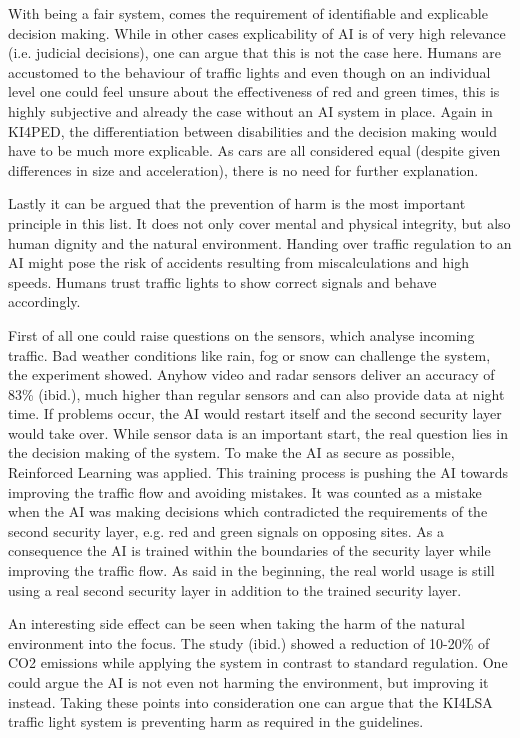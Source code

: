 With being a fair system, comes the requirement of identifiable and explicable decision making. While in other cases explicability of AI is of very high relevance (i.e. judicial decisions), one can argue that this is not the case here. Humans are accustomed to the behaviour of traffic lights and even though on an individual level one could feel unsure about the effectiveness of red and green times, this is highly subjective and already the case without an AI system in place. Again in KI4PED, the differentiation between disabilities and the decision making would have to be much more explicable. As cars are all considered equal (despite given differences in size and acceleration), there is no need for further explanation.

Lastly it can be argued that the prevention of harm is the most important principle in this list. It does not only cover mental and physical integrity, but also human dignity and the natural environment. Handing over traffic regulation to an AI might pose the risk of accidents resulting from miscalculations and high speeds. Humans trust traffic lights to show correct signals and behave accordingly.

First of all one could raise questions on the sensors, which analyse incoming traffic. Bad weather conditions like rain, fog or snow can challenge the system, the experiment showed. Anyhow video and radar sensors deliver an accuracy of 83\% 
(ibid.), much higher than regular sensors and can also provide data at night time. If problems occur, the AI would restart itself and the second security layer would take over. While sensor data is an important start, the real question lies in the decision making of the system. To make the AI as secure as possible, Reinforced Learning was applied. This training process is pushing the AI towards improving the traffic flow and avoiding mistakes. It was counted as a mistake when the AI was making decisions which contradicted the requirements of the second security layer, e.g. red and green signals on opposing sites. As a consequence the AI is trained within the boundaries of the security layer while improving the traffic flow. As said in the beginning, the real world usage is still using a real second security layer in addition to the trained security layer.

An interesting side effect can be seen when taking the harm of the natural environment into the focus. The study (ibid.) showed a reduction of 10-20\%
 of CO2 emissions while applying the system in contrast to standard regulation. One could argue the AI is not even not harming the environment, but improving it instead.
Taking these points into consideration one can argue that the KI4LSA traffic light system is preventing harm as required in the guidelines.\\


